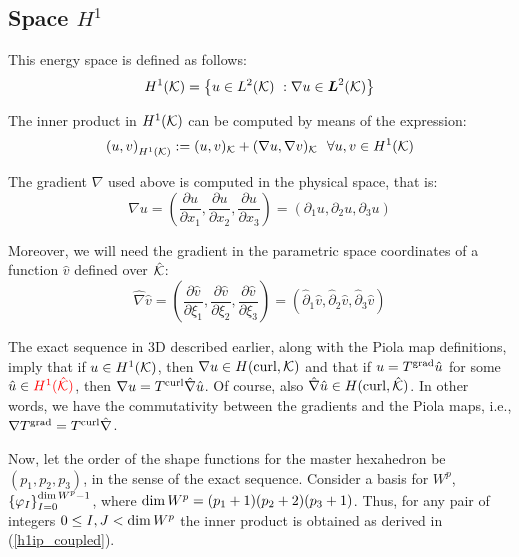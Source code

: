 \subsection{Space \texorpdfstring{$H^1$}{H1}}

This energy space is defined as follows:
% 
\begin{equation}
    H^1(\mathcal{K})=\left\{ u\in L^2(\mathcal{K})\ :\nabla u\in\boldsymbol{L}^2(\mathcal{K})\right\}
\end{equation}

\noindent The inner product in $H^1(\mathcal{K})$ can be computed by means of the expression:
% 
\begin{equation}
    \left(u,v\right)_{H^1(\mathcal{K})}:=(u,v)_{\mathcal{K}}+(\nabla u,\nabla v)_{\mathcal{K}}\ \ \forall u,v\in H^1(\mathcal{K})
\end{equation}

\noindent The gradient $\nabla$ used above is computed in the physical space, that is: 
% 
\begin{equation}
    \nabla u=\left(\frac{\partial u}{\partial x_1},\frac{\partial u}{\partial x_2},\frac{\partial u}{\partial x_3}\right) =\left(\partial_1 u,\partial_2 u, \partial_3 u\right)
\end{equation}

\noindent Moreover, we will need the gradient in the parametric space coordinates of a function $\hat{v}$ defined over $\hat{\mathcal{K}}$:
% 
\begin{equation}
    \hat{\nabla} \hat{v}=\left(\frac{\partial \hat{v}}{\partial\xi_1},\frac{\partial \hat{v}}{\partial\xi_2},\frac{\partial \hat{v}}{\partial\xi_3}\right) =\left(\hat{\partial}_1 \hat{v},\hat{\partial}_2 \hat{v}, \hat{\partial}_3 \hat{v}\right)
\end{equation}

The exact sequence in 3D described earlier, along with the Piola map definitions, imply that if $u\in H^1(\mathcal{K})$, then $\nabla u\in H(\operatorname{curl},\mathcal{K})$ and that if $u=T^{\operatorname{grad}}\hat{u}$ for some $\hat{u}\in{\color{red}{H^1(\hat{\mathcal{K}})}}$, then $\nabla u=T^{\operatorname{curl}}\hat{\nabla}\hat{u}$. Of course, also $\hat{\nabla}\hat{u}\in H(\operatorname{curl},\hat{\mathcal{K}})$.
{\color{blue}In other words, we have the commutativity between the gradients and the Piola maps, i.e., $\nabla T^{\operatorname{grad}}=T^{\operatorname{curl}}\hat{\nabla}$.}

Now, let the order of the shape functions for the master hexahedron be $(p_1,p_2,p_3)$, in the sense of the exact sequence. Consider a basis for $W^p$, $\left\{ \varphi_I \right\}_{I=0}^{\operatorname*{dim} W^p-1}$, where $\operatorname*{dim} W^p=(p_1+1)(p_2+2)(p_3+1)$. Thus, for any pair of integers $0\leq I,J<\operatorname*{dim} W^p$ the inner product is obtained as derived in (\ref{h1ip_coupled}).

